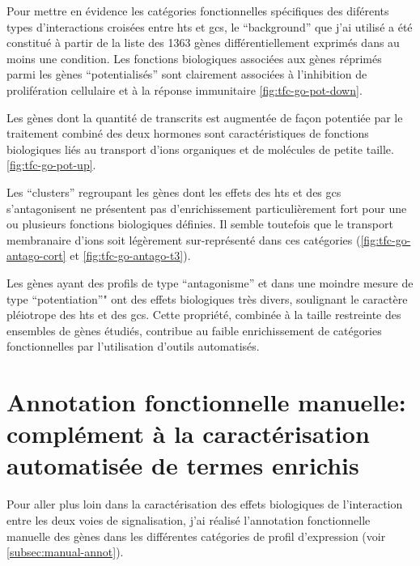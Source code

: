 \documentclass[../main.tex]{subfiles}
\begin{document}
	

	Pour mettre en évidence les catégories fonctionnelles spécifiques des diférents types d'interactions croisées entre \glspl{ht} et \glspl{gc}, le ``background'' que j'ai utilisé a été constitué à partir de la liste des 1363 gènes différentiellement exprimés dans au moins une condition.
	Les fonctions biologiques associées aux gènes réprimés parmi les gènes ``potentialisés'' sont clairement associées à l'inhibition de prolifération cellulaire et à la réponse immunitaire  \autoref{fig:tfc-go-pot-down}.

	

	Les gènes dont la quantité de transcrits est augmentée de façon potentiée par le traitement combiné des deux hormones sont caractéristiques de fonctions biologiques liés au transport d'ions organiques et de molécules de petite taille. \autoref{fig:tfc-go-pot-up}.

	

	Les ``clusters'' regroupant les gènes dont les effets des \glspl{ht} et des \glspl{gc} s'antagonisent ne présentent pas d'enrichissement particulièrement fort pour une ou plusieurs fonctions biologiques définies.
	Il semble toutefois que le transport membranaire d'ions soit légèrement sur-représenté dans ces catégories (\autoref{fig:tfc-go-antago-cort} et \autoref{fig:tfc-go-antago-t3}).

	

	

	Les gènes ayant des profils de type ``antagonisme'' et dans une moindre mesure de type ``potentiation''" ont des effets biologiques très divers, soulignant le caractère pléiotrope des \glspl{ht} et des \glspl{gc}.
	Cette propriété, combinée à la taille restreinte des ensembles de gènes étudiés, contribue au faible enrichissement de catégories fonctionnelles par l'utilisation d'outils automatisés.


\section{Annotation fonctionnelle manuelle: complément à la caractérisation automatisée de termes enrichis}

	Pour aller plus loin dans la caractérisation des effets biologiques de l'interaction entre les deux voies de signalisation, j'ai réalisé l'annotation fonctionnelle manuelle des gènes dans les différentes catégories de profil d'expression (voir \autoref{subsec:manual-annot}).
\end{document}
